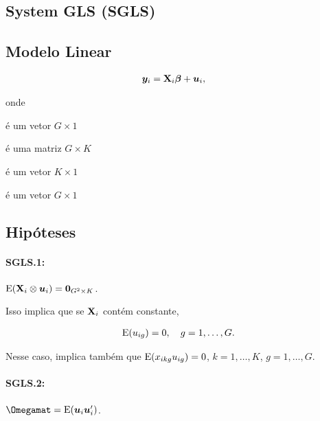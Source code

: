 \documentclass[11pt, oneside, a4paper, article]{article}
\numberwithin{equation}{section}
\begin{document}
\begin{description}
\section{System GLS (SGLS)}

\noindent
\citet[Sec.7.4 -- Consistency and Asymptotic Normality of Generalized Least Squares, p.153]{wool-2010} 

\subsection{Modelo Linear}

\vspace{-1.5 em}
\begin{align*}
\boldsymbol{y}_{i} &= \mathbf{X}_{i}\boldsymbol{\beta} + \boldsymbol{u}_{i},
\end{align*}

\noindent
onde

\vspace{-1 em}
\begin{description}[noitemsep]
	\item[$\yvec$] é um vetor $G \times 1$
	\item[$\Xmat_{i}$] é uma matriz $G \times K$
	\item[$\betavec$] é um vetor $K \times 1$
	\item[$\uvec$] é um vetor $G \times 1$
\end{description}

\subsection{Hipóteses}

\paragraph{SGLS.1:} $\text{E}(\mathbf{X}_{i} \otimes \boldsymbol{u}_{i}) = {\boldsymbol{0}}_{G^2 \times K}$.

\noindent
Isso implica que se $\Xmat_{i}$ contém constante, 

\vspace{-1 em}
\begin{align*}
	\text{E}(u_{ig}) = 0, \quad g=1,\dots, G.
\end{align*}

\noindent
Nesse caso, implica também que $\text{E}(x_{ikg} u_{ig})=0$, $k=1,\dots,K$, $g=1,\dots,G$.

\paragraph{SGLS.2:}  $\Omegamat = \E(\uvec_{i} \uvec_{i}^{\prime})$.


\end{description}
\end{document}
